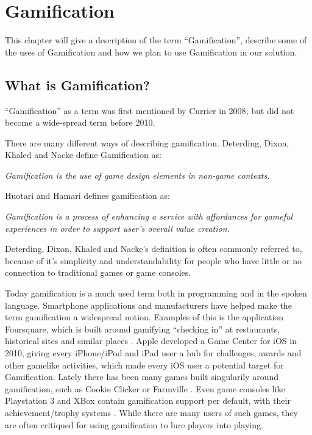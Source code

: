 \chapter{Gamification}
\label{chp:gamification}

This chapter will give a description of the term ``Gamification'', describe some of the uses of Gamification and how we plan to use Gamification in our solution.

\section{What is Gamification?}
\label{sec:whatisgamification}
``Gamification'' as a term was first mentioned by Currier in 2008\cite{gamificationcurrier}, but did not become a wide-spread term before 2010. 

There are many different ways of describing gamification. Deterding, Dixon, Khaled and Nacke\cite{Deterding:2011:GDE:2181037.2181040} define Gamification as:

\textit{Gamification is the use of game design elements in non-game
contexts.}

Huotari and Hamari\cite{huotari2012defining} defines gamification as:

\textit{Gamification is a process of enhancing a service with affordances for gameful experiences in order to support user's overall value creation.}

Deterding, Dixon, Khaled and Nacke's definition is often commonly referred to, because of it's simplicity and understandability for people who have little or no connection to traditional games or game consoles.

Today gamification is a much used term both in programming and in the spoken language. Smartphone applications and manufacturers have helped make the term gamification a widespread notion. Examples of this is the application Foursquare, which is built around gamifying ``checking in'' at restaurants, historical sites and similar places \cite{foursquare}. Apple developed a Game Center for iOS in 2010, giving every iPhone/iPod and iPad user a hub for challenges, awards and other gamelike activities\cite{applegamecenter}, which made every iOS user a potential target for Gamification. Lately there has been many games built singularily around gamification, such as Cookie Clicker \cite{cookieclicker} or Farmville \cite{farmville}. Even game consoles like Playstation 3 and XBox contain gamification support per default, with their achievement/trophy systems \cite{xbox, playstation}. While there are many users of such games, they are often critiqued for using gamification to lure players into playing. 


